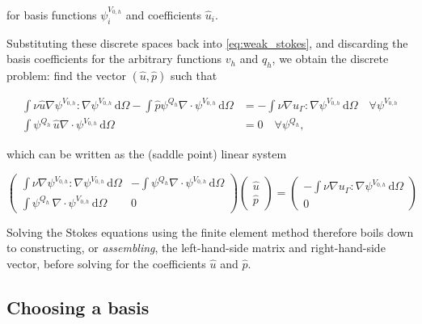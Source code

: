 \documentclass[thesis]{subfiles}
\begin{document}
for basis functions $\psi^{V_{0,h}}_i$ and coefficients $\hat u_i$.

Substituting these discrete spaces back into \cref{eq:weak_stokes}, and discarding the basis coefficients for the arbitrary functions $v_h$ and $q_h$, we obtain the discrete problem: find the vector $(\hat u, \hat p)$ such that

\begin{equation}
  \begin{aligned}
    \int \nu \hat u \nabla \psi^{V_{0,h}} : \nabla \psi^{V_{0,h}} \, \textrm{d}\Omega
    - \int \hat p \psi^{Q_h} \nabla \cdot \psi^{V_{0,h}} \, \textrm{d}\Omega
    &=
    - \int \nu \nabla u_\Gamma : \nabla \psi^{V_{0,h}} \, \textrm{d}\Omega
    \quad \forall \psi^{V_{0,h}} \\
    \int \psi^{Q_h} \, \hat u \nabla \cdot \psi^{V_{0,h}} \, \textrm{d}\Omega
    &= 0
    \quad \forall \psi^{Q_h},
  \end{aligned}
\end{equation}

which can be written as the (saddle point) linear system

\begin{equation}
  \left (
  \begin{array}{c|c}
    \int \nu \nabla \psi^{V_{0,h}} : \nabla \psi^{V_{0,h}} \, \textrm{d}\Omega
    &
    - \int \psi^{Q_h} \nabla \cdot \psi^{V_{0,h}} \, \textrm{d}\Omega \\
    \hline
    \int \psi^{Q_h} \, \nabla \cdot \psi^{V_{0,h}} \, \textrm{d}\Omega
    &
    0
  \end{array}
  \right )
  \left (
  \begin{array}{c}
    \hat u \\
    \hline
    \hat p
  \end{array}
  \right )
  =
  \left (
  \begin{array}{c}
    - \int \nu \nabla u_\Gamma : \nabla \psi^{V_{0,h}} \, \textrm{d}\Omega \\
    \hline
    0
  \end{array}
  \right )
  \label{eq:stokes_linear_system}
\end{equation}

Solving the Stokes equations using the finite element method therefore boils down to constructing, or \textit{assembling}, the left-hand-side matrix and right-hand-side vector, before solving for the coefficients $\hat u$ and $\hat p$.

\subsection{Choosing a basis}
\end{document}
